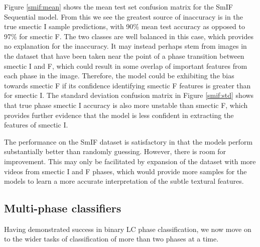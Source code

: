 \documentclass[12pt]{article}
\begin{document}
Figure \ref{smif:mean} shows the mean test set confusion matrix for the SmIF Sequential model. From this we see the greatest source of inaccuracy is in the true smectic I sample predictions, with 90\% mean test accuracy as opposed to 97\% for smectic F. The two classes are well balanced in this case, which provides no explanation for the inaccuracy. It may instead perhaps stem from images in the dataset that have been taken near the point of a phase transition between smectic I and F, which could result in some overlap of important features from each phase in the image. Therefore, the model could be exhibiting the bias towards smectic F if its confidence identifying smectic F features is greater than for smectic I. The standard deviation confusion matrix in Figure \ref{smif:std} shows that true phase smectic I accuracy is also more unstable than smectic F, which provides further evidence that the model is less confident in extracting the features of smectic I.

The performance on the SmIF dataset is satisfactory in that the models perform substantially better than randomly guessing. However, there is room for improvement. This may only be facilitated by expansion of the dataset with more videos from smectic I and F phases, which would provide more samples for the models to learn a more accurate interpretation of the subtle textural features.

\subsection{Multi-phase classifiers}
Having demonstrated success in binary LC phase classification, we now move on to the wider tasks of classification of more than two phases at a time.
\end{document}
